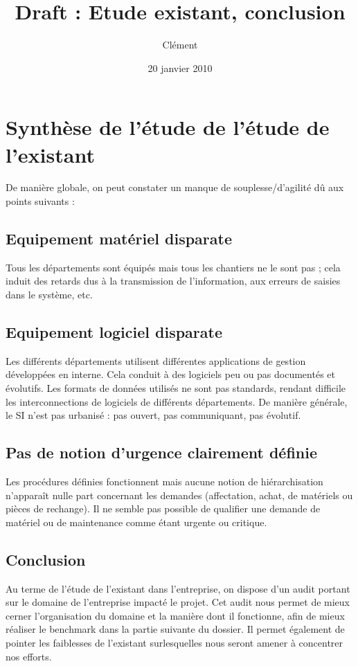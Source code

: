 \documentclass[a4paper]{article}
\title{Draft : Etude existant, conclusion}
\author{Clément}
\date{20 janvier 2010}
\begin{document}
\maketitle


\section{Synthèse de l'étude de l'étude de l'existant}

De manière globale, on peut constater un manque de souplesse/d'agilité dû
aux points suivants :


\subsection{Equipement matériel disparate}
Tous les départements sont équipés mais tous les chantiers ne le sont pas ;
cela induit des retards dus à la transmission de l'information, aux erreurs
de saisies dans le système, etc.  

\subsection{Equipement logiciel disparate}
Les différents départements utilisent différentes applications de gestion
développées en interne. Cela conduit à des logiciels peu ou pas documentés
et évolutifs. Les formats de données utilisés ne sont pas standards,
rendant difficile les interconnections de logiciels de différents
départements. De manière générale, le SI n'est pas urbanisé : pas ouvert,
pas communiquant, pas évolutif.

\subsection{Pas de notion d'urgence clairement définie}
Les procédures définies fonctionnent mais aucune notion de hiérarchisation
n'apparaît nulle part concernant les demandes (affectation, achat, de
matériels ou pièces de rechange).  Il ne semble pas possible de qualifier
une demande de matériel ou de maintenance comme étant urgente ou critique.


\subsection{Conclusion}

Au terme de l'étude de l'existant dans l'entreprise, on dispose d'un audit
portant sur le domaine de l'entreprise impacté le projet. Cet audit nous
permet de mieux cerner l'organisation du domaine et la manière dont il
fonctionne, afin de mieux réaliser le benchmark dans la partie suivante du
dossier. Il permet également de pointer les faiblesses de l'existant
surlesquelles nous seront amener à concentrer nos efforts.
\end{document}
